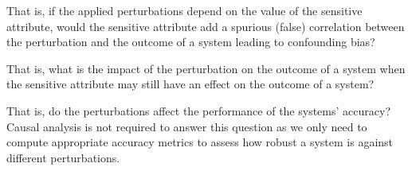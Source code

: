  That is, if the applied perturbations depend on the value of the sensitive attribute, would the sensitive attribute add a spurious (false) correlation between the perturbation and the outcome of a system leading to confounding bias?


 That is, what is the impact of the perturbation on the outcome of a system when the sensitive attribute may still have an effect on the outcome of a system? 


 That is, do the perturbations affect the performance of the systems' accuracy? Causal analysis is not required to answer this question as we only need to compute appropriate accuracy metrics to assess how robust a system is against different perturbations.




